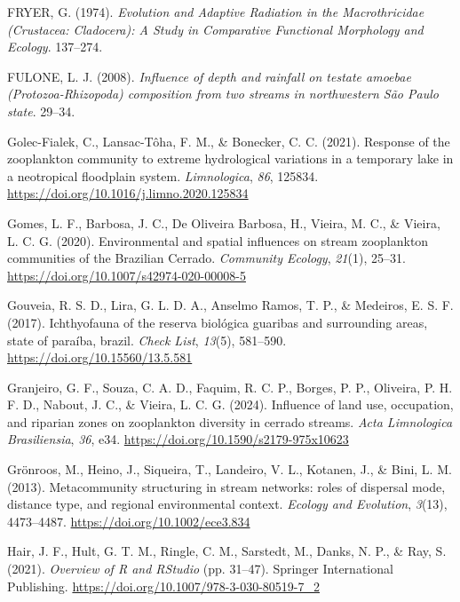 \documentclass[
  letterpaper,
  DIV=11,
  numbers=noendperiod]{scrartcl}
\newlength{\cslhangindent}
\newenvironment{CSLReferences}[2] %
 {\begin{list}{}{%
  \setlength{\itemindent}{0pt}
  \setlength{\leftmargin}{0pt}
  \setlength{\parsep}{0pt}
  \ifodd #1
   \setlength{\leftmargin}{\cslhangindent}
   \setlength{\itemindent}{-1\cslhangindent}
  \fi
  \setlength{\itemsep}{#2\baselineskip}}}
 {\end{list}}
\begin{document}
\begin{CSLReferences}{1}{0}
FRYER, G. (1974). \emph{Evolution and Adaptive Radiation in the
Macrothricidae (Crustacea: Cladocera): A Study in Comparative Functional
Morphology and Ecology}. 137--274.

FULONE, L. J. (2008). \emph{Influence of depth and rainfall on testate
amoebae (Protozoa-Rhizopoda) composition from two streams in
northwestern São Paulo state}. 29--34.

Golec-Fialek, C., Lansac-Tôha, F. M., \& Bonecker, C. C. (2021).
Response of the zooplankton community to extreme hydrological variations
in a temporary lake in a neotropical floodplain system.
\emph{Limnologica}, \emph{86}, 125834.
\url{https://doi.org/10.1016/j.limno.2020.125834}

Gomes, L. F., Barbosa, J. C., De Oliveira Barbosa, H., Vieira, M. C., \&
Vieira, L. C. G. (2020). Environmental and spatial influences on stream
zooplankton communities of the Brazilian Cerrado. \emph{Community
Ecology}, \emph{21}(1), 25--31.
\url{https://doi.org/10.1007/s42974-020-00008-5}

Gouveia, R. S. D., Lira, G. L. D. A., Anselmo Ramos, T. P., \& Medeiros,
E. S. F. (2017). Ichthyofauna of the reserva biológica guaribas and
surrounding areas, state of paraíba, brazil. \emph{Check List},
\emph{13}(5), 581--590. \url{https://doi.org/10.15560/13.5.581}

Granjeiro, G. F., Souza, C. A. D., Faquim, R. C. P., Borges, P. P.,
Oliveira, P. H. F. D., Nabout, J. C., \& Vieira, L. C. G. (2024).
Influence of land use, occupation, and riparian zones on zooplankton
diversity in cerrado streams. \emph{Acta Limnologica Brasiliensia},
\emph{36}, e34. \url{https://doi.org/10.1590/s2179-975x10623}

Grönroos, M., Heino, J., Siqueira, T., Landeiro, V. L., Kotanen, J., \&
Bini, L. M. (2013). Metacommunity structuring in stream networks: roles
of dispersal mode, distance type, and regional environmental context.
\emph{Ecology and Evolution}, \emph{3}(13), 4473--4487.
\url{https://doi.org/10.1002/ece3.834}

Hair, J. F., Hult, G. T. M., Ringle, C. M., Sarstedt, M., Danks, N. P.,
\& Ray, S. (2021). \emph{Overview of R and RStudio} (pp. 31--47).
Springer International Publishing.
\url{https://doi.org/10.1007/978-3-030-80519-7_2}


\end{CSLReferences}
\end{document}
